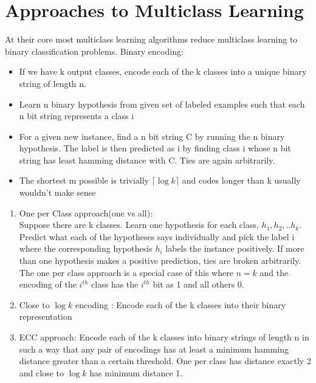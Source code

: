 \documentclass[11pt]{article}
\begin{document}
\section{Approaches to Multiclass Learning}
	At their core most multiclass learning algorithms reduce multiclass learning to binary classification problems. 
	Binary encoding:
	\begin{itemize}
		\item If we have k output classes, encode each of the k classes into a unique binary string of length n.
		\item Learn n binary hypothesis from given set of labeled examples such that each n bit string represents a class i
		\item For a given new instance, find a n bit string C by running the n binary hypothesis. The label is then predicted as i by finding class i whose n bit string has least hamming distance with C. Ties are again arbitrarily.
		\item The shortest m possible is trivially $\lceil \log k \rceil$ and codes longer than k usually wouldn't make sense
	\end{itemize}
	\begin{enumerate}
	\item One per Class approach(one vs all):\\ 
		Suppose there are k classes. Learn one hypothesis for each class, $h_1, h_2, ..h_k$. Predict what each of the hypotheses says individually and pick the label i where the corresponding hypothesis $h_i$ labels the instance positively. If more than one hypothesis makes a positive prediction, ties are broken arbitrarily.
        The one per class approach is a special case of this where $n=k$ and the encoding of the $i^{th}$ class has the $i^{th}$ bit as 1 and all others 0.
    \item Close to $\log k$ encoding : 
        Encode each of the k classes into their binary representation
	\item ECC approach: 
    	Encode each of the k classes into binary strings of length n in such a way that any pair of encodings has at least a minimum hamming distance greater than a certain threshold. One per class has distance exactly 2 and close to $\log k$ has minimum distance 1.
	\end{enumerate}
\end{document}
